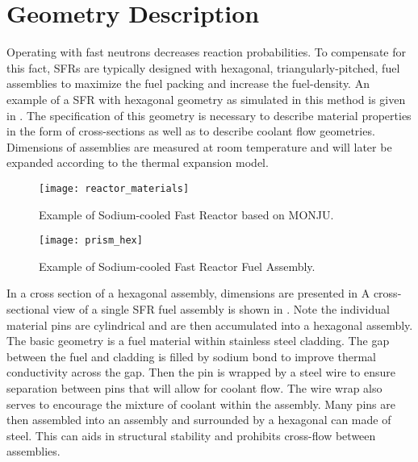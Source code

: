 \section{Geometry Description}
  \label{sec:geometry_description}
  Operating with fast neutrons decreases reaction probabilities. To compensate
  for this fact, SFRs are typically designed with hexagonal,
  triangularly-pitched, fuel assemblies to maximize the fuel packing and
  increase the fuel-density. An example of a SFR with hexagonal geometry as
  simulated in this method is given in .
  The specification of this geometry is necessary to
  describe material properties in the form of cross-sections as well as to
  describe coolant flow geometries. Dimensions of assemblies are measured at
  room temperature and will later be expanded according to the thermal expansion
  model.
  
  \begin{figure}
    \centering
    \texttt{[image: reactor\_materials]}
    \caption{Example of Sodium-cooled Fast Reactor based on MONJU.}
    \label{fig:reactor_materials}
  \end{figure}

  \begin{figure}
    \centering
    \texttt{[image: prism\_hex]}
    \caption{Example of Sodium-cooled Fast Reactor Fuel Assembly.}
    \label{fig:prism_hex}
  \end{figure}

  In a cross section of a hexagonal assembly, dimensions are presented in
  A cross-sectional view of a single SFR fuel assembly is shown in 
  . 
  Note the individual material pins are cylindrical and are then accumulated
  into a hexagonal assembly. The basic geometry is a fuel material within
  stainless steel cladding. The gap between the fuel and cladding is filled by
  sodium bond to improve thermal conductivity across the gap. Then the pin is
  wrapped by a steel wire to ensure separation between pins that will allow for
  coolant flow. The wire wrap also serves to encourage the mixture of coolant
  within the assembly. Many pins are then assembled into an assembly and
  surrounded by a hexagonal can made of steel. This can aids in structural
  stability and prohibits cross-flow between assemblies. 

